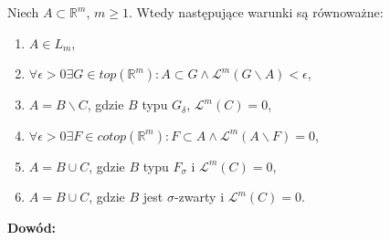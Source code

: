 \begin{tw}
	Niech $A \subset \mathbb{R}^m$, $m \geq 1$. Wtedy następujące warunki są równoważne:
	\begin{enumerate}
		\item $A \in L_m$,
		\item $\forall \epsilon > 0 \exists G \in top(\mathbb{R}^m): A \subset G \wedge \mathcal{L}^m(G \backslash A) < \epsilon$,
		\item $A = B \backslash C$, gdzie $B$ typu $G_{\delta}$, $\mathcal{L}^m(C) = 0$,
		\item $\forall \epsilon>0 \exists F \in cotop(\mathbb{R}^m): F \subset A \wedge \mathcal{L}^m(A \backslash F) = 0$,
		\item $A = B \cup C$, gdzie $B$ typu $F_{\sigma}$ i  $\mathcal{L}^m(C) = 0$,
		\item $A = B \cup C$, gdzie $B$ jest $\sigma$-zwarty i $\mathcal{L}^m(C) = 0$.
	\end{enumerate}

	\textbf{Dowód:} \citep[AM4, 3.42]{Tworzewski}
\end{tw}